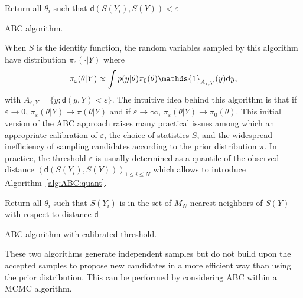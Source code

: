 \documentclass[english,graybox,envcountchap,envcountsame,sectrefs,shortlabels]{svmono}
\theoremstyle{style}
\newcommand{\eqsp}{}
\begin{document}
\begin{algorithm}[H] \label{alg:ABC}
Return all $\theta_i$ such that $\mathsf{d}(S(Y_i),S(Y))<\varepsilon$\;
\caption{ABC algorithm.}
\end{algorithm}

\medskip

When $S$ is the identity function, the random variables sampled by this  algorithm have distribution $\pi_{\varepsilon}(\cdot |Y)$ where
$$
\pi_{\varepsilon}(\theta|Y)\propto \int p(y|\theta)\pi_0(\theta) \mathds{1}_{A_{\varepsilon,Y}}(y)\rmd y\eqsp,
$$
with $A_{\varepsilon,Y} = \{y\eqsp;\mathsf{d}(y,Y)<\varepsilon\eqsp\}$. The intuitive idea behind this algorithm is that if  $\varepsilon \to 0$, $\pi_{\varepsilon}(\theta|Y) \to \pi(\theta|Y)$ and if $\varepsilon \to \infty$, $\pi_{\varepsilon}(\theta|Y) \to \pi_0(\theta)$. This initial version of the ABC approach raises many practical  issues among which an appropriate calibration of $\varepsilon$, the choice of statistics $S$, and the widespread inefficiency of sampling candidates according to the prior distribution $\pi$. In practice, the threshold $\varepsilon$ is usually determined as a quantile of the observed distance $(\mathsf{d}(S(Y_i),S(Y)))_{1\leqslant i \leqslant N}$ which allows to introduce Algorithm~\ref{alg:ABC:quant}.

\medskip

\begin{algorithm}[H] \label{alg:ABC:quant}
Return all $\theta_i$ such that $S(Y_i)$ is in the set of $M_N$ nearest neighbors of $S(Y)$ with respect to distance $\mathsf{d}$\;
\caption{ABC algorithm with calibrated threshold.}
\end{algorithm}

\medskip

These two algorithms generate independent samples but do not build upon the accepted samples to propose new candidates in a more efficient way than using the prior distribution. This can be performed by considering  ABC within a MCMC algorithm. %




\end{document}
